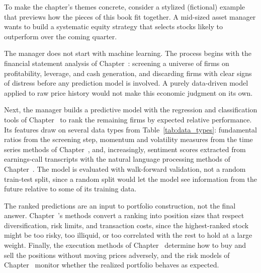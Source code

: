 \documentclass[../ai_in_finance]{subfiles}
\begin{document}
\label{sec:intro-case-vignette}

To make the chapter's themes concrete, consider a stylized (fictional) example that previews how the pieces of this book fit together. A mid-sized asset manager wants to build a systematic equity strategy that selects stocks likely to outperform over the coming quarter.

The manager does not start with machine learning. The process begins with the financial statement analysis of Chapter~: screening a universe of firms on profitability, leverage, and cash generation, and discarding firms with clear signs of distress before any prediction model is involved. A purely data-driven model applied to raw price history would not make this economic judgment on its own.

Next, the manager builds a predictive model with the regression and classification tools of Chapter~ to rank the remaining firms by expected relative performance. Its features draw on several data types from Table~\ref{tab:data_types}: fundamental ratios from the screening step, momentum and volatility measures from the time series methods of Chapter~, and, increasingly, sentiment scores extracted from earnings-call transcripts with the natural language processing methods of Chapter~. The model is evaluated with walk-forward validation, not a random train-test split, since a random split would let the model see information from the future relative to some of its training data.

The ranked predictions are an input to portfolio construction, not the final answer. Chapter~'s methods convert a ranking into position sizes that respect diversification, risk limits, and transaction costs, since the highest-ranked stock might be too risky, too illiquid, or too correlated with the rest to hold at a large weight. Finally, the execution methods of Chapter~ determine how to buy and sell the positions without moving prices adversely, and the risk models of Chapter~ monitor whether the realized portfolio behaves as expected.
\end{document}
